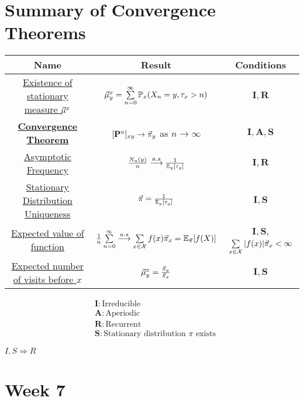 \documentclass[12pt,a4paper]{article}
\begin{document}
\section{Summary of Convergence Theorems}
\begin{tabular}{|c|c|c|}
    \hline 
    Name & Result & Conditions \\
    \hline 
    \hyperref[thm411]{Existence of stationary measure $\va\mu^x$} & 
    $\va\mu^x_y = \sum\limits_{n=0}^{\infty}\mathbb{P}_x(X_n = y, \tau_x > n)$
    & $\mathbf{I}, \mathbf{R}$ \\ 
    \hline 
    \hyperref[convthm]{\textbf{Convergence Theorem}} & $[\vb P^n]_{xy} \to \va\pi_y$ as $n\to \infty$ & $\mathbf{I}, \mathbf{A}, \mathbf{S}$ \\
    \hline 
    \hyperref[asymfreq]{Asymptotic Frequency} & $\frac{N_n(y)}{n}\overset{a.s}{\longrightarrow} \frac{1}{\mathbb{E}_y[\tau_y]}$ & $\mathbf{I, R}$ \\ 
    \hline 
    \hyperref[uniquedist]{Stationary Distribution Uniqueness} & $\va\pi = \frac{1}{\mathbb{E}_y[\tau_y]}$ & $\mathbf{I,S}$ \\ 
    \hline 
    \hyperref[expfun]{Expected value of function} & 
    $\frac{1}{n}\sum\limits_{n=0}^{\infty}\overset{a.s}{\longrightarrow} \sum\limits_{x\in \mathcal{X}}^{}f(x)\va\pi_x = \mathbb{E}_{\va\pi}[f(X)]$
    & $\mathbf{I, S}$, $\sum\limits_{x\in \mathcal{X}}^{}|f(x)|\va\pi_x < \infty$\\ 
    \hline 
    \hyperref[thm611]{Expected number of visits before $x$} & $\va\mu^x_y = \frac{\va\pi_y}{\va\pi_x}$ & $\mathbf{I, S}$ \\ 
    \hline 
\end{tabular} 
\begin{note}
    \begin{align*}
        &\mathbf{I}: \text{Irreducible}\\
        &\mathbf{A}: \text{Aperiodic}\\
        &\mathbf{R}: \text{Recurrent}\\
        &\mathbf{S}: \text{Stationary distribution $\pi$ exists}
    \end{align*}
\end{note}
\begin{remark}
    $I, S \Rightarrow R$
\end{remark}
\newpage
\section{Week 7}
\end{document}
